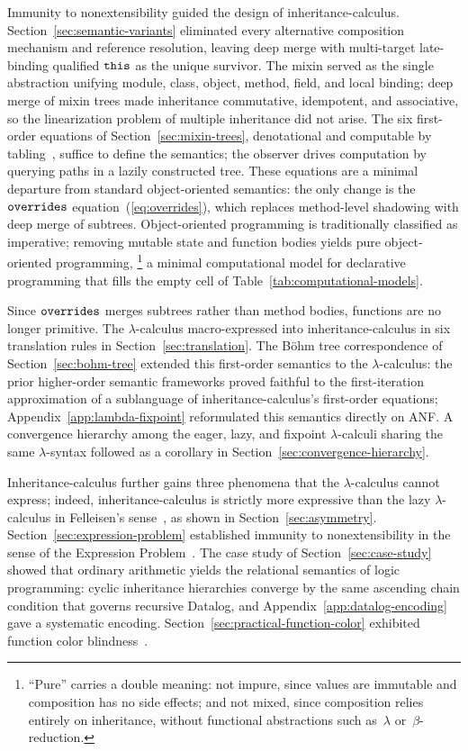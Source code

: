 Immunity to nonextensibility guided the design of
inheritance-calculus.
Section~\ref{sec:semantic-variants} eliminated every
alternative composition mechanism and reference resolution,
leaving deep merge with multi-target late-binding qualified
$\mathtt{this}$ as the unique survivor.
The mixin served as the single abstraction unifying module,
class, object, method, field, and local binding;
deep merge of mixin trees made inheritance commutative, idempotent, and associative,
so the linearization problem of multiple inheritance did not arise.
The six first-order equations of Section~\ref{sec:mixin-trees},
denotational and computable by
tabling~\cite{tamaki1986-tabled-resolution}, suffice to
define the semantics; the observer drives computation by
querying paths in a lazily constructed tree.
These equations are a minimal departure from standard
object-oriented semantics: the only change is the $\mathtt{overrides}$ equation~(\ref{eq:overrides}),
which replaces method-level shadowing with deep merge of subtrees.
Object-oriented programming is traditionally classified as
imperative; removing mutable state and function bodies yields
pure object-oriented programming,%
\footnote{
  ``Pure'' carries a double meaning:
  not impure, since values are immutable and composition has no
  side effects; and not mixed, since composition relies entirely on
  inheritance, without functional abstractions such
  as~$\lambda$ or~$\beta$-reduction.
}
a minimal computational model for declarative programming
that fills the empty cell of Table~\ref{tab:computational-models}.

Since $\mathtt{overrides}$ merges subtrees rather than method bodies,
functions are no longer primitive.
The $\lambda$-calculus macro-expressed into
inheritance-calculus in six translation rules in
Section~\ref{sec:translation}.
The B\"ohm tree correspondence of
Section~\ref{sec:bohm-tree} extended this first-order
semantics to the $\lambda$-calculus:
the prior higher-order semantic frameworks proved faithful
to the first-iteration approximation of a sublanguage of
inheritance-calculus's first-order equations;
Appendix~\ref{app:lambda-fixpoint} reformulated this
semantics directly on ANF\@.
A convergence hierarchy among the eager, lazy, and fixpoint
$\lambda$-calculi sharing the same $\lambda$-syntax followed
as a corollary in Section~\ref{sec:convergence-hierarchy}.

Inheritance-calculus further gains three phenomena
that the $\lambda$-calculus cannot express;
indeed, inheritance-calculus is strictly more expressive
than the lazy $\lambda$-calculus in Felleisen's
sense~\cite{felleisen1991-expressive-power},
as shown in Section~\ref{sec:asymmetry}.
Section~\ref{sec:expression-problem} established immunity
to nonextensibility in the sense of the
Expression Problem~\cite{wadler1998-expression-problem}.
The case study of Section~\ref{sec:case-study} showed that
ordinary arithmetic yields the relational semantics of logic
programming: cyclic inheritance hierarchies converge by
the same ascending chain condition that governs recursive
Datalog, and Appendix~\ref{app:datalog-encoding} gave a
systematic encoding.
Section~\ref{sec:practical-function-color} exhibited
function color
blindness~\cite{nystrom2015-function-color}.

